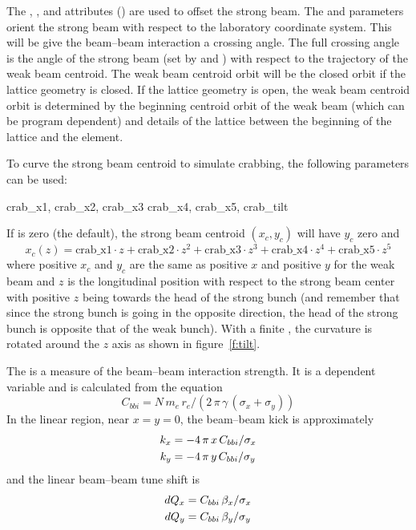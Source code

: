 The , , and  attributes () are used to offset
the strong beam. The  and  parameters orient the strong beam with respect to
the laboratory coordinate system. This will be give the beam--beam interaction a crossing angle. The
full crossing angle is the angle of the strong beam (set by  and ) with
respect to the trajectory of the weak beam centroid. The weak beam centroid orbit will be the closed
orbit if the lattice geometry is closed. If the lattice geometry is open, the weak beam centroid
orbit is determined by the beginning centroid orbit of the weak beam (which can be program
dependent) and details of the lattice between the beginning of the lattice and the 
element.

To curve the strong beam centroid to simulate crabbing, the following parameters can be used:
\begin{example}
  crab_x1,    crab_x2,     crab_x3
  crab_x4,    crab_x5,     crab_tilt
\end{example}
If  is zero (the default), the strong beam centroid $(x_c, y_c)$ will have $y_c$ zero
and
\begin{equation}
  x_c(z) = \text{crab_x1} \cdot z + \text{crab_x2} \cdot z^2 + \text{crab_x3} \cdot z^3 + 
                                    \text{crab_x4} \cdot z^4 + \text{crab_x5} \cdot z^5
\end{equation}
where positive $x_c$ and $y_c$ are the same as positive $x$ and positive $y$ for the weak beam and
$z$ is the longitudinal position with respect to the strong beam center with positive $z$ being
towards the head of the strong bunch (and remember that since the strong bunch is going in the
opposite direction, the head of the strong bunch is opposite that of the weak bunch). With a finite
, the curvature is rotated around the $z$ axis as shown in figure~\ref{f:tilt}.

The  is a measure of the beam--beam interaction strength.  It is a dependent
variable and is calculated from the equation
\begin{equation}
  C_{bbi} = N \, m_e \, r_e / (2 \, \pi \, \gamma \, (\sigma_x + \sigma_y))
\end{equation}
In the linear region, near $x = y = 0$, the 
beam--beam kick is approximately 
\begin{align}
  k_x &= -4\, \pi \, x \, C_{bbi} / \sigma_x \nonumber \\
  k_y &= -4\, \pi \, y \, C_{bbi} / \sigma_y 
\end{align}
and the linear beam--beam tune shift is 
\begin{align}
  dQ_x &= C_{bbi} \, \beta_x / \sigma_x \nonumber \\
  dQ_y &= C_{bbi} \, \beta_y / \sigma_y \nonumber \\
\end{align}

